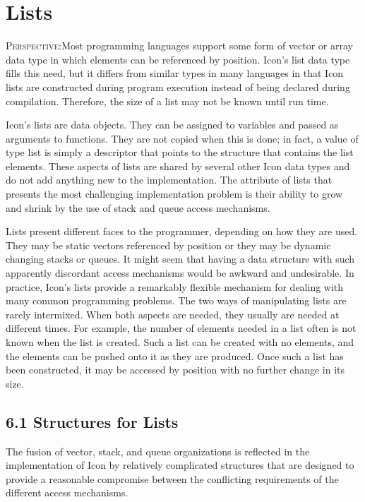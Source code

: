 \chapter{Lists}

\textsc{Perspective}:Most programming languages support some form of
vector or array data type in which elements can be referenced by
position. Icon's list data type fills this need, but it differs from
similar types in many languages in that Icon lists are constructed
during program execution instead of being declared during
compilation. Therefore, the size of a list may not be known until run
time.

Icon's lists are data objects. They can be assigned to variables and
passed as arguments to functions. They are not copied when this is
done; in fact, a value of type list is simply a descriptor that points
to the structure that contains the list elements. These aspects of
lists are shared by several other Icon data types and do not add
anything new to the implementation. The attribute of lists that
presents the most challenging implementation problem is their ability
to grow and shrink by the use of stack and queue access mechanisms.

Lists present different faces to the programmer, depending on how they
are used. They may be static vectors referenced by position or they
may be dynamic changing stacks or queues. It might seem that having a
data structure with such apparently discordant access mechanisms would
be awkward and undesirable. In practice, Icon's lists provide a
remarkably flexible mechanism for dealing with many common programming
problems. The two ways of manipulating lists are rarely
intermixed. When both aspects are needed, they usually are needed at
different times. For example, the number of elements needed in a list
often is not known when the list is created. Such a list can be
created with no elements, and the elements can be pushed onto it as
they are produced. Once such a list has been constructed, it may be
accessed by position with no further change in its size.

\section[6.1 Structures for Lists]{6.1 Structures for Lists}

The fusion of vector, stack, and queue organizations is reflected in
the implementation of Icon by relatively complicated structures that
are designed to provide a reasonable compromise between the
conflicting requirements of the different access mechanisms.


